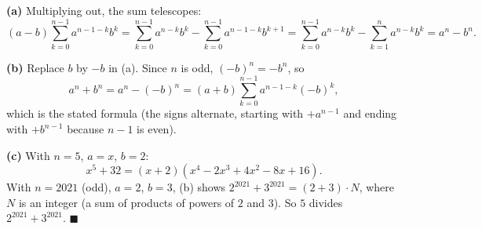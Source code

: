 \textbf{(a)} Multiplying out, the sum telescopes:
\[(a-b)\sum_{k=0}^{n-1}a^{n-1-k}b^k=\sum_{k=0}^{n-1}a^{n-k}b^k-\sum_{k=0}^{n-1}a^{n-1-k}b^{k+1}=\sum_{k=0}^{n-1}a^{n-k}b^k-\sum_{k=1}^{n}a^{n-k}b^{k}=a^n-b^n.\]

\textbf{(b)} Replace $b$ by $-b$ in (a). Since $n$ is odd, $(-b)^n=-b^n$, so
\[a^n+b^n=a^n-(-b)^n=(a+b)\sum_{k=0}^{n-1}a^{n-1-k}(-b)^k,\]
which is the stated formula (the signs alternate, starting with $+a^{n-1}$ and ending with $+b^{n-1}$ because $n-1$ is even).

\textbf{(c)} With $n=5$, $a=x$, $b=2$:
\[x^5+32=\boxed{(x+2)\left(x^4-2x^3+4x^2-8x+16\right)}.\]
With $n=2021$ (odd), $a=2$, $b=3$, (b) shows $2^{2021}+3^{2021}=(2+3)\cdot N$, where $N$ is an integer (a sum of products of powers of $2$ and $3$). So $5$ divides $2^{2021}+3^{2021}$. $\blacksquare$
